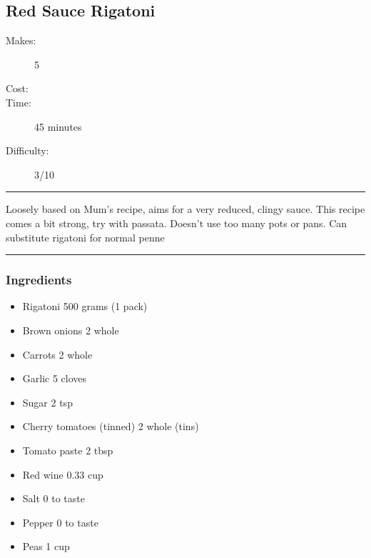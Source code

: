 \documentclass[]{article}
\begin{document}
\subsection*{\center\huge Red Sauce Rigatoni}
\begin{description}
\item[Makes:] 5 
\item[Cost:] \textdollar
\item[Time:] 45 minutes
\item[Difficulty:] 3/10
\end{description}
\vspace{0.2cm}\hrule\vspace{0.5cm}
\begin{adjustwidth}{0.5 cm}{0.5 cm}

Loosely based on Mum's recipe, aims for a very reduced, clingy sauce. This recipe comes a bit strong, try with passata. Doesn't use too many pots or pans. Can substitute rigatoni for normal penne \hfill{}\color{black}

\end{adjustwidth}
\vspace{0.5cm}\hrule
\subsubsection*{\Large Ingredients}
\begin{multicols}{2}
\begin{itemize}
 \item Rigatoni \hfill 500 grams (1 pack)
 \item Brown onions \hfill 2 whole
 \item Carrots \hfill 2 whole
 \item Garlic \hfill 5 cloves
 \item Sugar \hfill 2 tsp
 \item Cherry tomatoes (tinned) \hfill 2 whole (tins)
 \item Tomato paste \hfill 2 tbsp
 \item Red wine \hfill 0.33 cup
 \item Salt \hfill 0 to taste
 \item Pepper \hfill 0 to taste
 \item Peas \hfill 1 cup
\end{itemize}
\end{multicols}
\end{document}
